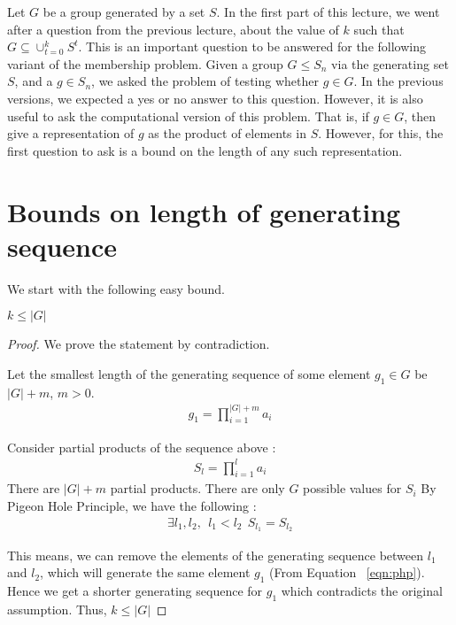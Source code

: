 

Let $G$ be a group generated by a set $S$. In the first part of this lecture, we went after a question from the previous lecture, about the value of $k$ such that $G \subseteq \cup_{t=0}^k S^t$. This is an important question to be answered for the following variant of the membership problem. Given a group $G \le S_n$ via the generating set $S$, and a $g \in S_n$, we asked the problem of testing whether $g \in G$. In the previous versions, we expected a yes or no answer to this question. However, it is also useful to ask the computational version of this problem. That is, if $g \in G$, then give a representation of $g$ as the product of elements in $S$. However, for this, the first question to ask is a bound on the length of any such representation.

\section{Bounds on length of generating sequence}

We start with the following easy bound.

\begin{proposition}
$k \leq |G|$
\end{proposition}
\begin{proof}
We prove the statement by contradiction. 

Let the smallest length of the generating sequence of 
some element $g_1 \in G$ be $|G| + m$, $m>0$.
\begin{align}
g_1 = \prod\limits_{i=1}^{|G|+m} a_i
\end{align}

Consider partial products of the sequence above : 
\begin{align}
S_l = \prod\limits_{i=1}^{l} a_i
\end{align}
There are $|G|+m$ partial products. There are only $G$ possible values for $S_i$ 
By Pigeon Hole Principle, we have the following :
\begin{align}
\label{eqn:php}
\exists l_1, l_2, ~~ l_1 < l_2 ~~ S_{l_1} = S_{l_2}
\end{align}

This means, we can remove the elements of the generating
sequence between $l_1$ and $l_2$, which will generate the
same element $g_1$ (From Equation ~\ref{eqn:php}). Hence we get a shorter generating sequence for $g_1$ which contradicts the original assumption. Thus, $k \leq |G|$
\end{proof}

